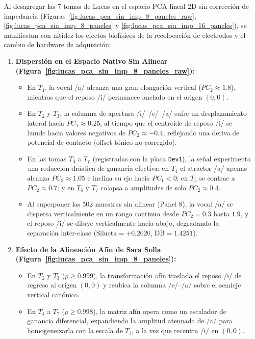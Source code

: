 \documentclass[11pt,a4paper,openany]{book}
\theoremstyle{definition}
\begin{document}
Al desagregar las 7 tomas de Lucas en el espacio PCA lineal 2D sin corrección de impedancia (Figuras~\ref{fig:lucas_pca_sin_imp_8_paneles_raw}, \ref{fig:lucas_pca_sin_imp_8_paneles} y \ref{fig:lucas_pca_sin_imp_16_paneles}), se manifiestan con nitidez los efectos biofísicos de la recolocación de electrodos y el cambio de hardware de adquisición:
\begin{enumerate}
    \item \textbf{Dispersión en el Espacio Nativo Sin Alinear (Figura~\ref{fig:lucas_pca_sin_imp_8_paneles_raw}):}
    \begin{itemize}
        \item En $T_1$, la vocal /a/ alcanza una gran elongación vertical ($PC_2 \approx 1.8$), mientras que el reposo /i/ permanece anclado en el origen $(0,0)$.
        \item En $T_2$ y $T_3$, la columna de apertura /i/--/e/--/a/ sufre un desplazamiento lateral hacia $PC_1 \approx 0.25$, al tiempo que el centroide de reposo /i/ se hunde hacia valores negativos de $PC_2 \approx -0.4$, reflejando una deriva de potencial de contacto (offset tónico no corregido).
        \item En las tomas $T_4$ a $T_7$ (registradas con la placa \texttt{Dev1}), la señal experimenta una reducción drástica de ganancia efectiva: en $T_4$ el atractor /a/ apenas alcanza $PC_2 \approx 1.05$ e inclina su eje hacia $PC_1 < 0$; en $T_5$ se contrae a $PC_2 \approx 0.7$; y en $T_6$ y $T_7$ colapsa a amplitudes de solo $PC_2 \approx 0.4$.
        \item Al superponer las 502 muestras sin alinear (Panel 8), la vocal /a/ se dispersa verticalmente en un rango continuo desde $PC_2 = 0.3$ hasta $1.9$, y el reposo /i/ se diluye verticalmente hacia abajo, degradando la separación inter-clase ($\text{Silueta} = +0.2020$, $\text{DB} = 1.4251$).
    \end{itemize}
    \item \textbf{Efecto de la Alineación Afín de Sara Solla (Figura~\ref{fig:lucas_pca_sin_imp_8_paneles}):}
    \begin{itemize}
        \item En $T_2$ y $T_3$ ($\rho \ge 0.999$), la transformación afín traslada el reposo /i/ de regreso al origen $(0,0)$ y reubica la columna /e/--/a/ sobre el semieje vertical canónico.
        \item En $T_4$ a $T_7$ ($\rho \ge 0.998$), la matriz afín opera como un escalador de ganancia diferencial, expandiendo la amplitud atenuada de /a/ para homogeneizarla con la escala de $T_1$, a la vez que recentra /i/ en $(0,0)$.

\end{itemize}
\end{enumerate}
\end{document}
